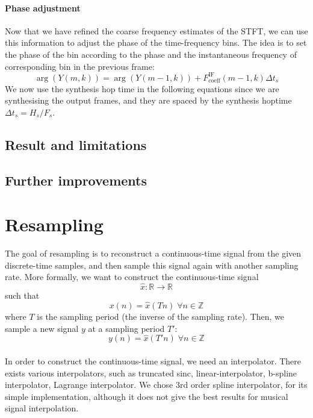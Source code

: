 \documentclass[letterpaper]{article}
\begin{document}
\paragraph{Phase adjustment}
Now that we have refined the coarse frequency estimates of the STFT, we can use
this information to adjust the phase of the time-frequency bins. The idea is
to set the phase of the bin according to the phase and the instantaneous frequency
of corresponding bin in the previous frame:
\begin{equation}
		\arg(Y(m,k))=\arg(Y(m-1,k)) + F_{\text{coeff}}^{\text{IF}}(m-1,k)\Delta t_s
\end{equation}
We now use the synthesis hop time in
the following equations since we are synthesising the output frames, and they
are spaced by the synthesis hoptime \(\Delta t_s=H_s/F_s\).

\subsection{Result and limitations}
\subsection{Further improvements}

\section{Resampling}
The goal of resampling is to reconstruct a continuous-time signal from the given
discrete-time samples, and then sample this signal again with another sampling
rate. More formally, we want to construct the continuous-time signal
\begin{equation}\hat x:\mathbb{R}\to\mathbb{R}\end{equation}
such that
\begin{equation}x(n) = \hat x(Tn) \;\forall n\in\mathbb{Z}\end{equation}
where \(T\) is the sampling period (the inverse of the sampling rate). Then, we
sample a new signal \(y\) at a sampling period \(T'\):
\begin{equation*}y(n) = \hat x(T'n) \;\forall n\in\mathbb{Z}\end{equation*}
\paragraph{}
In order to construct the continuous-time signal, we need an interpolator. There
exists various interpolators, such as truncated sinc, linear-interpolator,
b-spline interpolator, Lagrange interpolator. We chose 3rd order spline
interpolator, for its simple implementation, although it does not give the best
results for musical signal interpolation.
\end{document}
